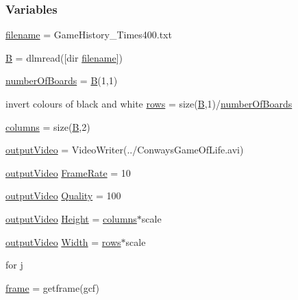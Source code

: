 \subsubsection*{Variables}
\begin{DoxyCompactItemize}
\item 
\hyperlink{a00099_a2ff994e16bf9521154de4cf659a3b689}{filename} = \textquotesingle{}Game\+History\+\_\+Times400.\+txt\textquotesingle{}
\item 
\hyperlink{a00099_a9d3d9048db16a7eee539e93e3618cbe7}{B} = dlmread(\mbox{[}dir \hyperlink{a00107_a4a32877dda2cdbef8aa5f01eacc16f0c}{filename}\mbox{]})
\item 
\hyperlink{a00099_a6093167544fa2acb408ee7af13b715c0}{number\+Of\+Boards} = \hyperlink{a00099_a9d3d9048db16a7eee539e93e3618cbe7}{B}(1,1)
\item 
invert colours of black and white \hyperlink{a00099_ab56a9d9a5877fa9746152fae2c6a74dc}{rows} = size(\hyperlink{a00099_a9d3d9048db16a7eee539e93e3618cbe7}{B},1)/\hyperlink{a00099_a6093167544fa2acb408ee7af13b715c0}{number\+Of\+Boards}
\item 
\hyperlink{a00099_aa0f5c667e1c3e498fdb0a33ed98dd988}{columns} = size(\hyperlink{a00099_a9d3d9048db16a7eee539e93e3618cbe7}{B},2)
\item 
\hyperlink{a00099_a90c346df14c7ec8c77240e20732f2ac1}{output\+Video} = Video\+Writer(\textquotesingle{}../Conways\+Game\+Of\+Life.\+avi\textquotesingle{})
\item 
\hyperlink{a00099_a90c346df14c7ec8c77240e20732f2ac1}{output\+Video} \hyperlink{a00099_a67157b1672f9243078fb788d8987bda8}{Frame\+Rate} = 10
\item 
\hyperlink{a00099_a90c346df14c7ec8c77240e20732f2ac1}{output\+Video} \hyperlink{a00099_ac6ff3e0e8f9b0c2916f1f686c39ea2af}{Quality} = 100
\item 
\hyperlink{a00099_a90c346df14c7ec8c77240e20732f2ac1}{output\+Video} \hyperlink{a00099_ab734dfc6b1d672d82e0a028d0a6fe4c2}{Height} = \hyperlink{a00107_a616e3ce2d5365d3d3c41f5d00d4a1985}{columns}$\ast$scale
\item 
\hyperlink{a00099_a90c346df14c7ec8c77240e20732f2ac1}{output\+Video} \hyperlink{a00099_a82f73784da270910a261ea2f2f89b249}{Width} = \hyperlink{a00107_a74742cb5c8e2ac354a60cb73383d8176}{rows}$\ast$scale
\item 
for \hyperlink{a00099_ac86694252f8dfdb19aaeadc4b7c342c6}{j}
\item 
\hyperlink{a00099_a943f49763dd36e31fc7ea8604fcad789}{frame} = getframe(gcf)
\end{DoxyCompactItemize}


